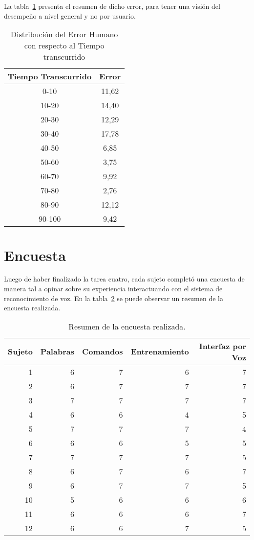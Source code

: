 La tabla~\ref{sec:error-tiempo} presenta el resumen de dicho error, para tener una visi\'on del desempe\~no a nivel
general y no por usuario.

\begin{table}[H]
\centering
\footnotesize
\begin{tabular}{|c|c|}
\hline
    Tiempo Transcurrido & Error \\
    \hline
0-10  &  11,62 \\
10-20 &  14,40 \\
20-30 &  12,29 \\
30-40 &  17,78 \\
40-50 &  6,85 \\
50-60 &  3,75 \\
60-70 &  9,92 \\
70-80 &  2,76 \\
80-90 &  12,12 \\
90-100 & 9,42 \\
    \hline
\end{tabular}
\caption{Distribuci\'on del Error Humano con respecto al Tiempo transcurrido}
\label{sec:error-tiempo}
\end{table}

\section{Encuesta}

Luego de haber finalizado la tarea cuatro, cada sujeto complet\'o una encuesta de manera tal a
opinar sobre su experiencia interactuando con el sistema de reconocimiento de voz. 
En la tabla~\ref{sec:tabla-encuesta} se puede observar un resumen de la encuesta realizada.


\begin{table}[H] 
\centering
\footnotesize
\begin{tabular}{|r|r|r|r|r|}
\hline
    Sujeto & Palabras & Comandos & Entrenamiento & Interfaz por Voz \\
    \hline
    1 & 6 & 7 & 6 & 7 \\
    2 & 6 & 7 & 7 & 7 \\
    3 & 7 & 7 & 7 & 7 \\
    4 & 6 & 6 & 4 & 5 \\
    5 & 7 & 7 & 7 & 4 \\
    6 & 6 & 6 & 5 & 5 \\
    7 & 7 & 7 & 7 & 5 \\
    8 & 6 & 7 & 6 & 7  \\
    9 & 6 & 7 & 7 & 5  \\
    10 & 5 & 6 & 6 & 6  \\
    11 & 6 & 6 & 6 & 7  \\
    12 & 6 & 6 & 7 & 5  \\
\hline
\end{tabular}
\caption{Resumen de la encuesta realizada.}
\label{sec:tabla-encuesta}
\end{table}

